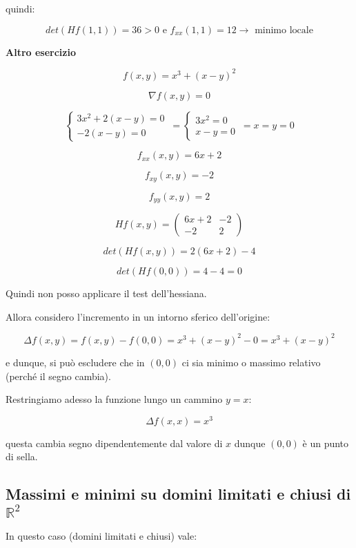 \documentclass[../appunti-analisi.tex]{subfiles}
\begin{document}
quindi:

\[
    det (Hf(1,1)) = 36 >0 \text{ e } f_{xx}(1,1) = 12 \rightarrow \text{ minimo locale}
\]

\textbf{Altro esercizio} 

\[
    f(x,y) = x^{3} + (x-y)^{2}
\]

\[
    \nabla f(x,y)=0
\]

\[
        \begin{cases}
    3x^{2}+2(x-y) = 0\\
    -2(x-y) = 0
        \end{cases}\, = \begin{cases}
    3x^{2}= 0\\
    x-y= 0
        \end{cases}\, = x = y =0
\]

\[
    f_{xx}(x,y) = 6x+2
\]

\[
    f_{xy}(x,y) = -2
\]

\[
    f_{yy}(x,y) = 2
\]

\[
    H f(x,y) = \begin{pmatrix}
        6x+2 & -2\\
        -2 & 2
    \end{pmatrix}
\]

\[
    det(H f(x,y)) = 2(6x+2) -4
\]

\[
    det(H f(0,0)) = 4-4 = 0
\]

Quindi non posso applicare il test dell'hessiana.

Allora considero l'incremento in un intorno sferico dell'origine:

\[
    \Delta f(x,y) = f(x,y) - f(0,0) = x^{3}+(x-y)^{2} -0 = x^{3}+(x-y)^{2}
\]

e dunque, si può escludere che in $(0,0)$ ci sia minimo o massimo relativo (perché il segno cambia).

Restringiamo adesso la funzione lungo un cammino $y=x$:

\[
    \Delta f(x,x) = x^{3}
\]

questa cambia segno dipendentemente dal valore di $x$ dunque $(0,0)$ è un punto di sella.


\subsection{Massimi e minimi su domini limitati e chiusi di $\mathbb{R}^{2}$}

In questo caso (domini limitati e chiusi) vale:
\end{document}
